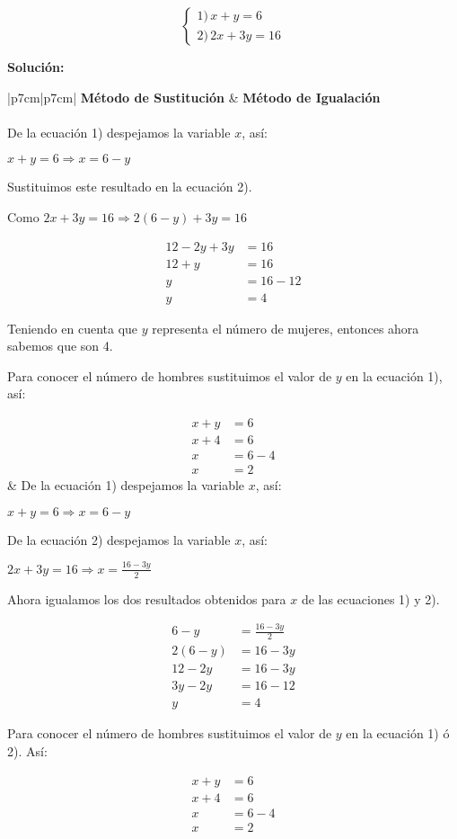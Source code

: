\documentclass[12pt,a4paper]{article}
\begin{document}
\[ \begin{cases}
1) \, x + y = 6 \\
2) \, 2x + 3y = 16
\end{cases} \]

\textbf{Solución:}

\begin{table}[h]
\begin{tabular}{|p{7cm}|p{7cm}|}
\hline
\centering\textbf{Método de Sustitución} & \textbf{Método de Igualación} \\
\hline \\[.5em]
De la ecuación 1) despejamos la variable $x$, así:

$x + y = 6 \Rightarrow x = 6 - y$

Sustituimos este resultado en la ecuación 2).

Como $2x + 3y = 16 \Rightarrow 2(6 - y) + 3y = 16$

\[ \begin{aligned}
12 - 2y + 3y &= 16 \\
12 + y &= 16 \\
y &= 16 - 12 \\
y &= 4
\end{aligned} \]

Teniendo en cuenta que $y$ representa el número de mujeres, entonces ahora sabemos que son 4.

Para conocer el número de hombres sustituimos el valor de $y$ en la ecuación 1), así:

\[ \begin{aligned}
x + y &= 6 \\
x + 4 &= 6 \\
x &= 6 - 4 \\
x &= 2
\end{aligned} \]
&
De la ecuación 1) despejamos la variable $x$, así:

$x + y = 6 \Rightarrow x = 6 - y$

De la ecuación 2) despejamos la variable $x$, así:

$2x + 3y = 16 \Rightarrow x = \frac{16 - 3y}{2}$

Ahora igualamos los dos resultados obtenidos para $x$ de las ecuaciones 1) y 2).

\[ \begin{aligned}
6 - y &= \frac{16 - 3y}{2} \\
2(6 - y) &= 16 - 3y \\
12 - 2y &= 16 - 3y \\
3y - 2y &= 16 - 12 \\
y &= 4
\end{aligned} \]

Para conocer el número de hombres sustituimos el valor de $y$ en la ecuación 1) ó 2). Así:

\[ \begin{aligned}
x + y &= 6 \\
x + 4 &= 6 \\
x &= 6 - 4 \\
x &= 2
\end{aligned} \]
\\
\hline
\end{tabular}
\end{table}
\end{document}
